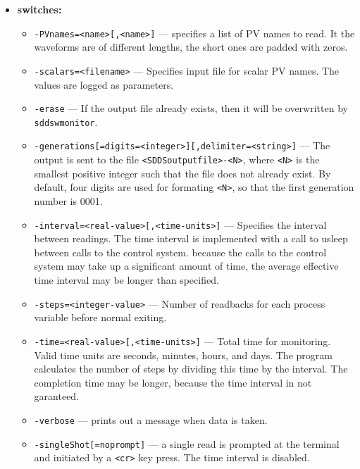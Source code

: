 \begin{itemize}
%
\item {\bf switches:}
%
%
    \begin{itemize}
%
%
        \item {\verb+-PVnames=<name>[,<name>]+} ---
                   specifies a list of PV names to read.  It the waveforms are
                   of different lengths, the short ones are padded with zeros.
        \item {\tt -scalars=<filename>} ---  Specifies input file for scalar PV names. The values
                are logged as parameters.
        \item {\tt -erase} --- If the output file already exists, then it will be overwritten
                by \verb+sddswmonitor+.
        \item {\verb+-generations[=digits=<integer>][,delimiter=<string>]+} ---
                The output is sent to the file \verb+<SDDSoutputfile>-<N>+, where \verb+<N>+ is
                   the smallest positive integer such that the file does not already
                   exist.   By default, four digits are used for formating \verb+<N>+, so that
                   the first generation number is 0001.
        \item {\tt -interval=<real-value>[,<time-units>]} --- Specifies the interval between readings. The time
                interval is implemented with a call to usleep between calls to the control system.
                because the calls to the control system may take up a significant amount of time, the average
                effective time interval may be longer than specified. 
        \item {\tt -steps=<integer-value>} --- Number of readbacks for each process variable before normal exiting.
        \item {\tt -time=<real-value>[,<time-units>]} --- Total time for monitoring. Valid time units are
                seconds, minutes, hours, and days. The program calculates the number of steps by dividing this time
                by the interval. The completion time may be longer, because the time interval in not garanteed.
        \item {\tt -verbose} --- prints out a message when data is taken.
        \item {\verb+-singleShot[=noprompt]+} --- a single read is prompted at the terminal
                and initiated by a \verb+<cr>+ key press. The time interval is disabled. 

\end{itemize}
\end{itemize}
